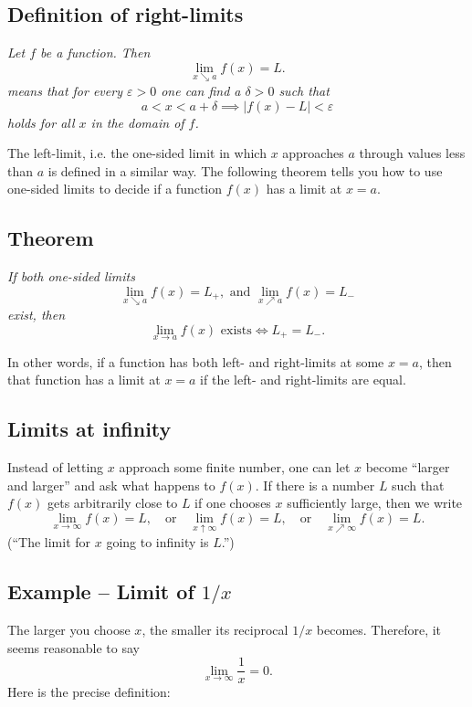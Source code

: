 \subsection{Definition of right-limits}
\itshape
Let $f$ be a function.  Then
\begin{equation}\label{eq:one-sided-lim-formulation}
  \lim_{x\searrow a} f(x) = L.
\end{equation}
means that for every $\varepsilon>0$ one can find a $\delta>0$ such that
\[
a<x<a+\delta \implies |f(x)-L|<\varepsilon
\]
holds for all $x$ in the domain of $f$.  \upshape

The left-limit, i.e. the one-sided limit in which $x$ approaches $a$
through values less than $a$ is defined in a similar way.  The following
theorem tells you how to use one-sided limits to decide if a function
$f(x)$ has a limit at $x=a$.

\subsection{Theorem}
\itshape
If both one-sided limits
\[
\lim_{x\searrow a} f(x) = L_{+}, \text{ and } \lim_{x\nearrow a} f(x) =
L_{-}
\]
exist, then
\[
\lim_{x\to a} f(x) \text{ exists} \iff L_{+}=L_{-}.
\]
\upshape

In other words, if a function has both left- and right-limits at some
$x=a$, then that function has a limit at $x=a$ if the left- and
right-limits are equal.


\subsection{Limits at infinity}
Instead of letting $x$ approach some finite number, one can let $x$ become
``larger and larger'' and ask what happens to $f(x)$.  If there is a number
$L$ such that $f(x)$ gets arbitrarily close to $L$ if one chooses $x$
sufficiently large, then we write
\[
\lim_{x\to \infty} f(x) = L,\quad \text{or}\quad \lim_{x\uparrow \infty}
f(x) = L,\quad \text{or}\quad \lim_{x\nearrow \infty} f(x) = L.
\]
(``The limit for $x$ going to infinity is $L$.'')


\subsection{Example -- Limit of $1/x$}
The larger you choose $x$, the smaller its reciprocal $1/x$ becomes.
Therefore, it seems reasonable to say
\[
\lim_{x\to\infty} \frac 1x =0.
\]
Here is the precise definition:

